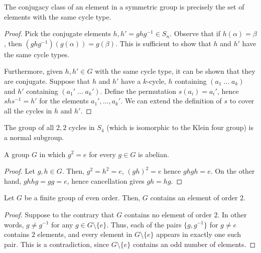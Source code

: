 \documentclass[11pt]{article}
\theoremstyle{definition}
\theoremstyle{remark}
\numberwithin{equation}{section}
\begin{document}
    \begin{lemma}
        The conjugacy class of an element in a symmetric group is precisely the set
        of elements with the same cycle type.
    \end{lemma}
    \begin{proof}
        Pick the conjugate elements $h, h' = ghg^{-1} \in S_n$. Observe that if
        $h(\alpha) = \beta$, then $(ghg^{-1})(g(\alpha)) = g(\beta)$. This is
        sufficient to show that $h$ and $h'$ have the same cycle types.

        Furthermore, given $h, h' \in G$ with the same cycle type, it can be shown
        that they are conjugate. Suppose that $h$ and $h'$ have a $k$-cycle, $h$
        containing $(a_1 \;\dots\; a_k)$ and $h'$ containing $(a_1' \;\dots\; a_k')$.
        Define the permutation $s(a_i) = a_i'$, hence $shs^{-1} = h'$ for the
        elements $a_1', \dots, a_k'$. We can extend the definition of $s$ to cover
        all the cycles in $h$ and $h'$.
    \end{proof}
    \begin{corollary}
        The group of all $2,2$ cycles in $S_4$ (which is isomorphic to the Klein four
        group) is a normal subgroup.
    \end{corollary}

    \begin{lemma}
        A group $G$ in which $g^2 = e$ for every $g \in G$ is abelian.
    \end{lemma}
    \begin{proof}
        Let $g, h \in G$. Then, $g^2 = h^2 = e$, $(gh)^2 = e$ hence $ghgh = e$.
        On the other hand, $ghhg = gg = e$, hence cancellation gives $gh = hg$.
    \end{proof}

    \begin{lemma}
        Let $G$ be a finite group of even order. Then, $G$ contains an element of
        order $2$.
    \end{lemma}
    \begin{proof}
        Suppose to the contrary that $G$ contains no element of order $2$. In other
        words, $g \neq g^{-1}$ for any $g \in G\setminus\{e\}$. Thus, each of the
        pairs $\{g, g^{-1}\}$ for $g \neq e$ contains $2$ elements, and every element
        in $G\setminus\{e\}$ appears in exactly one such pair. This is a
        contradiction, since $G\setminus\{e\}$ contains an odd number of elements.
    \end{proof}
\end{document}
